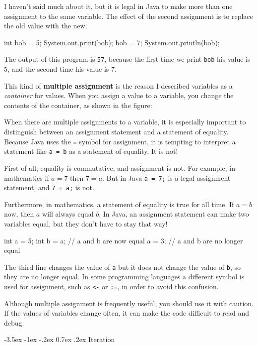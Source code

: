 \documentclass{book}
\makeatletter
\renewcommand{\section}{\@startsection 
    {section} {1} {0mm}%
    {-3.5ex \@plus -1ex \@minus -.2ex}%
    {0.7ex \@plus.2ex}%
    {\normalfont\Large\bfseries}}
\makeatother
\begin{document}
I haven't said much about it, but it is legal in Java to
make more than one assignment to the same variable.  The
effect of the second assignment is to replace the old value
with the new.

\begin{verbatimtab}
    int bob = 5;
    System.out.print(bob);
    bob = 7;
    System.out.println(bob);
\end{verbatimtab}
%
The output of this program is {\tt 57}, because the first
time we print {\tt bob} his value is 5, and the second time
his value is 7.

This kind of {\bf multiple assignment} is the reason I
described variables as a {\em container} for values.  When
you assign a value to a variable, you change the contents of
the container, as shown in the figure:




When there are multiple assignments to a variable, it is especially
important to distinguish between an assignment statement and a
statement of equality.  Because Java uses the {\tt =} symbol for
assignment, it is tempting to interpret a statement like {\tt a = b}
as a statement of equality.  It is not!

First of all, equality is commutative, and assignment is not.
For example, in mathematics if $a = 7$ then $7 = a$.  But in
Java {\tt a = 7;} is a legal assignment statement, and {\tt 7 = a;}
is not.

Furthermore, in mathematics, a statement of equality is true
for all time.  If $a = b$ now, then $a$ will always equal $b$.
In Java, an assignment statement can make two variables equal,
but they don't have to stay that way!

\begin{verbatimtab}
    int a = 5;
    int b = a;     // a and b are now equal
    a = 3;         // a and b are no longer equal
\end{verbatimtab}
%
The third line changes the value of {\tt a} but it does not
change the value of {\tt b}, so they are no longer equal.
In some programming languages a different symbol is used
for assignment, such as {\tt <-} or {\tt :=}, in order to
avoid this confusion.

Although multiple assignment is frequently useful, you should use it
with caution.  If the values of variables change often, it can make
the code difficult to read and debug.


\section{Iteration}
\end{document}
